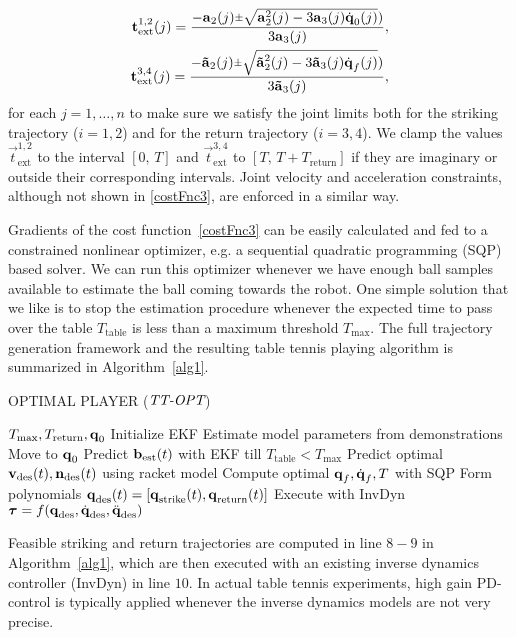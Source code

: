 %
\begin{align}
\vec{t}_{\mathrm{ext}}^{1,2}(j) = \frac{-\vec{a}_2(j) \rpm \sqrt{\vec{a}_2^2(j) - 3\vec{a}_3(j)\dot{\joint}_0(j)})}{3\vec{a}_3(j)}, \\
\vec{t}_{\mathrm{ext}}^{3,4}(j) = \frac{-\vec{\tilde{a}}_2(j) \rpm \sqrt{\vec{\tilde{a}}_2^2(j) - 3\vec{\tilde{a}}_3(j)\dot{\joint}_f(j)})}{3\vec{\tilde{a}}_3(j)},
\label{jointPosExtrema}
\end{align}
%
\noindent for each $j = 1, \ldots, n$ to make sure we satisfy the joint limits both for the striking trajectory ($i = 1,2$)  and for the return trajectory ($i = 3,4$). We clamp the values $\vec{t}^{1,2}_{\mathrm{ext}}$ to the interval $[0, \, T]$ and $\vec{t}^{3,4}_{\mathrm{ext}}$ to $[T, \, T + T_{\mathrm{return}}]$ if they are imaginary or outside their corresponding intervals. Joint velocity and acceleration constraints, although not shown in \eqref{costFnc3}, are enforced in a similar way. %

Gradients of the cost function~\eqref{costFnc3} can be easily calculated and fed to a constrained nonlinear optimizer, e.g. a sequential quadratic programming (SQP) based solver. We can run this optimizer whenever we have enough ball samples available to estimate the ball coming towards the robot. One simple solution that we like is to stop the estimation procedure whenever the expected time to pass over the table $T_{\mathrm{table}}$ is less than a maximum threshold $T_{\mathrm{max}}$. The full trajectory generation framework and the resulting table tennis playing algorithm is summarized in Algorithm~\ref{alg1}.


\begin{algorithm}[tb]
   \caption{OPTIMAL PLAYER ($\emph{TT-OPT}$)}
   \label{alg1}
\begin{algorithmic}[1]
    $T_{\mathrm{max}}, T_{\mathrm{return}}, \boldsymbol{\mathrm{q}}_0$ 
   \STATE Initialize EKF
   \STATE Estimate model parameters from demonstrations
   \STATE Move to $\boldsymbol{\mathrm{q}}_0$
   \LOOP
	   \STATE Predict $\boldsymbol{\mathrm{b}}_{\mathrm{est}}(t)$ with EKF till $T_{\mathrm{table}} < T_{\mathrm{max}}$
	   \STATE Predict optimal $\boldsymbol{\mathrm{v}}_{\mathrm{des}}(t), \boldsymbol{\mathrm{n}}_{\mathrm{des}}(t)$ using racket model
	   \STATE Compute optimal $\boldsymbol{\mathrm{q}}_f, \dot{\boldsymbol{\mathrm{q}}}_f, T$ with SQP
	   \STATE Form polynomials $\boldsymbol{\mathrm{q}}_{\mathrm{des}}(t) = [\boldsymbol{\mathrm{q}}_{\mathrm{strike}}(t), \boldsymbol{\mathrm{q}}_{\mathrm{return}}(t)]$ %
	   \STATE Execute with InvDyn $\boldsymbol{\mathrm{\tau}} = f(\boldsymbol{\mathrm{q}}_{\mathrm{des}},\dot{\boldsymbol{\mathrm{q}}}_{\mathrm{des}},\ddot{\boldsymbol{\mathrm{q}}}_{\mathrm{des}})$
   \ENDLOOP
\end{algorithmic}
\end{algorithm}

Feasible striking and return trajectories are computed in line $8-9$ in Algorithm~\ref{alg1}, which are then executed with an existing inverse dynamics controller (InvDyn) in line $10$. In actual table tennis experiments, high gain PD-control is typically applied whenever the inverse dynamics models are not very precise.